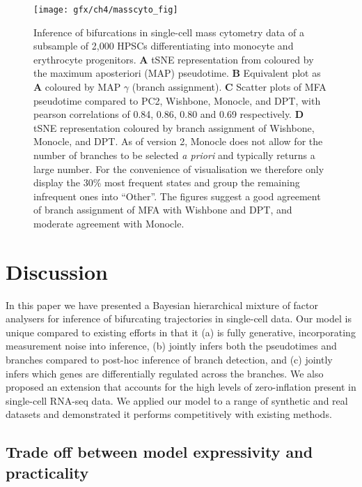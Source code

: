 \begin{figure}
	\centering
	\texttt{[image: gfx/ch4/masscyto\_fig]}
	\caption{Inference of bifurcations in single-cell mass cytometry data of a subsample of 2,000 HPSCs differentiating into monocyte and erythrocyte progenitors.
	{\normalfont
	\textbf{A} tSNE representation from \cite{setty2016wishbone} coloured by the maximum aposteriori (MAP) pseudotime.
	\textbf{B} Equivalent plot as \textbf{A} coloured by MAP $\gamma$ (branch assignment).
	\textbf{C} Scatter plots of MFA pseudotime compared to PC2, Wishbone, Monocle, and DPT, with pearson correlations of 0.84, 0.86, 0.80 and 0.69 respectively.
	\textbf{D} tSNE representation coloured by branch assignment of Wishbone, Monocle, and DPT. As of version 2, Monocle does not allow for the number of branches to be selected \emph{a priori} and typically returns a large number. For the convenience of visualisation we therefore only display the 30\% most frequent states and group the remaining infrequent ones into ``Other''. The figures suggest a good agreement of branch assignment of MFA with Wishbone and DPT, and moderate agreement with Monocle.
	}} \label{fig:masscyto}
\end{figure}



\section{Discussion}

In this paper we have presented a Bayesian hierarchical mixture of factor analysers for inference of bifurcating trajectories in single-cell data. Our model is unique compared to existing efforts in that it (a) is fully generative, incorporating measurement noise into inference, (b) jointly infers both the pseudotimes and branches compared to post-hoc inference of branch detection, and (c) jointly infers which genes are differentially regulated across the branches. We also proposed an extension that accounts for the high levels of zero-inflation present in single-cell RNA-seq data. We applied our model to a range of synthetic and real datasets and demonstrated it  performs competitively with existing methods.

\subsection{Trade off between model expressivity and practicality}


